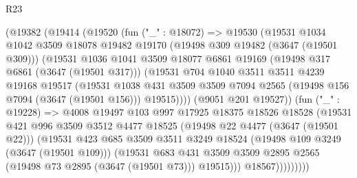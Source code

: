 \begin{lexlean}{R23}
\begin{coremodule}
              (@19382
                (@19414
                  (@19520
                    (fun ("_" : @18072) =>
                    @19530
                      (@19531
                        @1034
                        @1042
                        @3509
                        @18078
                        @19482
                        @19170
                        (@19498 @309 @19482 (@3647 (@19501 @309)))
                        (@19531
                          @1036
                          @1041
                          @3509
                          @18077
                          @6861
                          @19169
                          (@19498 @317 @6861 (@3647 (@19501 @317)))
                          (@19531
                            @704
                            @1040
                            @3511
                            @3511
                            @4239
                            @19168
                            @19517
                            (@19531
                              @1038
                              @431
                              @3509
                              @3509
                              @7094
                              @2565
                              (@19498 @156 @7094 (@3647 (@19501 @156)))
                              @19515))))
                      (@9051 @201 @19527))
                    (fun ("_" : @19228) =>
                    @4008
                      @19497
                      @103
                      @997
                      @17925
                      @18375
                      @18526
                      @18528
                      (@19531
                        @421
                        @996
                        @3509
                        @3512
                        @4477
                        @18525
                        (@19498 @22 @4477 (@3647 (@19501 @22)))
                        (@19531
                          @423
                          @685
                          @3509
                          @3511
                          @3249
                          @18524
                          (@19498 @109 @3249 (@3647 (@19501 @109)))
                          (@19531
                            @683
                            @431
                            @3509
                            @3509
                            @2895
                            @2565
                            (@19498 @73 @2895 (@3647 (@19501 @73)))
                            @19515)))
                      @18567)))))))))

\end{coremodule}
\end{lexlean}
